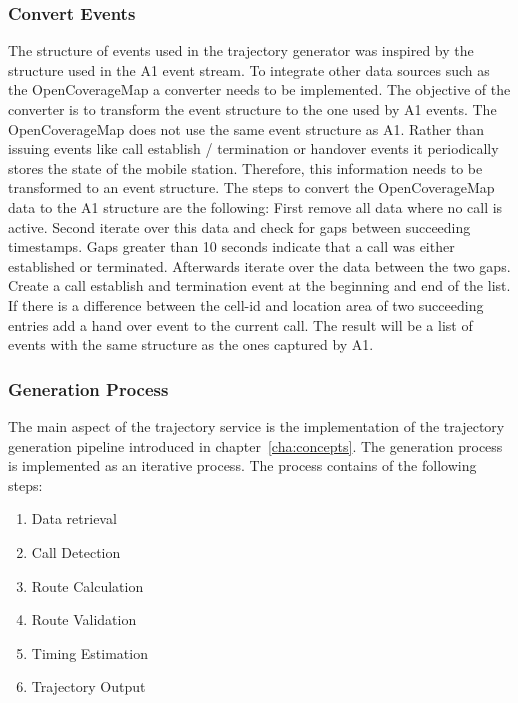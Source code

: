 \documentclass[master,english]{hgbthesis}
\begin{document}
\subsubsection{Convert Events}
The structure of events used in the trajectory generator was inspired by the structure used in the A1 event stream. To integrate other data sources such as the OpenCoverageMap a converter needs to be implemented. The objective of the converter is to transform the event structure to the one used by A1 events.
The OpenCoverageMap does not use the same event structure as A1. Rather than issuing events like call establish / termination or handover events it periodically stores the state of the mobile station. Therefore, this information needs to be transformed to an event structure. The steps to convert the OpenCoverageMap data to the A1 structure are the following: First remove all data where no call is active. Second iterate over this data and check for gaps between succeeding timestamps. Gaps greater than 10 seconds indicate that a call was either established or terminated. Afterwards iterate over the data between the two gaps. Create a call establish and termination event at the beginning and end of the list. If there is a difference between the cell-id and location area of two succeeding entries add a hand over event to the current call. The result will be a  list of events with the same structure as the ones captured by A1.
\subsubsection{Generation Process}
The main aspect of the trajectory service is the implementation of the trajectory generation pipeline introduced in chapter~\ref{cha:concepts}. The generation process is implemented as an iterative process. The process contains of the following steps:
\begin{enumerate}
\item Data retrieval
\item Call Detection
\item Route Calculation
\item Route Validation
\item Timing Estimation
\item Trajectory Output
\end{enumerate}
\end{document}
